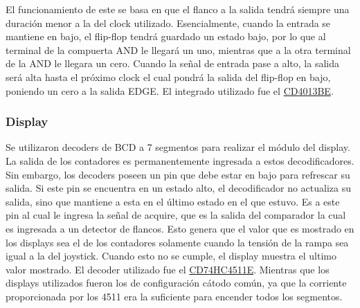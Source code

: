 El funcionamiento de este se basa en que el flanco a la salida tendrá siempre una duración menor a la del clock utilizado. Esencialmente, cuando la entrada se mantiene en bajo, el flip-flop tendrá guardado un estado bajo, por lo que al terminal de la compuerta AND le llegará un uno, mientras que a la otra terminal de la AND le llegara un cero. Cuando la señal de entrada pase a alto, la salida será alta hasta el próximo clock el cual pondrá la salida del flip-flop en bajo, poniendo un cero a la salida EDGE. El integrado utilizado fue el \href{http://www.ti.com/lit/ds/symlink/cd4013b.pdf}{CD4013BE}.

\subsubsection{Display}

Se utilizaron decoders de BCD a 7 segmentos para realizar el módulo del display. La salida de los contadores es permanentemente ingresada a estos decodificadores. Sin embargo, los decoders poseen un pin que debe estar en bajo para refrescar su salida. Si este pin se encuentra en un estado alto, el decodificador no actualiza su salida, sino que mantiene a esta en el último estado en el que estuvo. Es a este pin al cual le ingresa la señal de acquire, que es la salida del comparador la cual es ingresada a un detector de flancos. Esto genera que el valor que es mostrado en los displays sea el de los contadores solamente cuando la tensión de la rampa sea igual a la del joystick. Cuando esto no se cumple, el display muestra el ultimo valor mostrado.
El decoder utilizado fue el \href{http://www.ti.com/lit/ds/schs279d/schs279d.pdf}{CD74HC4511E}. Mientras que los displays utilizados fueron los de configuración cátodo común, ya que la corriente proporcionada por los 4511 era la suficiente para encender todos los segmentos.

